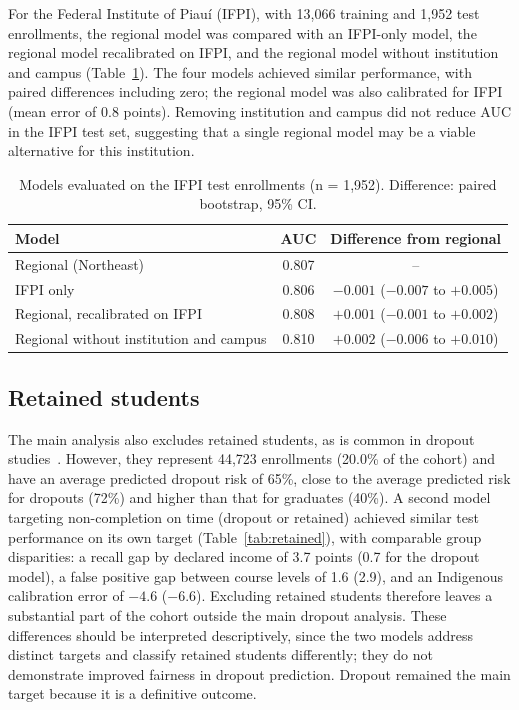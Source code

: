 \documentclass[12pt]{article}
\begin{document}
For the Federal Institute of Piauí (IFPI), with 13,066 training and 1,952 test enrollments, the regional model
was compared with an IFPI-only model, the regional model recalibrated on IFPI, and the regional model without
institution and campus (Table~\ref{tab:ifpi}). The four models achieved similar performance, with paired differences including
zero; the regional model was also calibrated for IFPI (mean error of 0.8 points). Removing institution and campus
did not reduce AUC in the IFPI test set, suggesting that a single regional model may be a viable alternative for
this institution.

\begin{table}[ht]
\centering
\caption{Models evaluated on the IFPI test enrollments (n = 1,952). Difference: paired bootstrap, 95\% CI.}
\label{tab:ifpi}
\small
\begin{tabular}{lcc}
\toprule
Model & AUC & Difference from regional \\
\midrule
Regional (Northeast) & 0.807 & -- \\
IFPI only & 0.806 & $-0.001$ ($-0.007$ to $+0.005$) \\
Regional, recalibrated on IFPI & 0.808 & $+0.001$ ($-0.001$ to $+0.002$) \\
Regional without institution and campus & 0.810 & $+0.002$ ($-0.006$ to $+0.010$) \\
\bottomrule
\end{tabular}
\end{table}

\subsection{Retained students}
\label{sec:retained}

The main analysis also excludes retained students, as is common in dropout studies~\cite{oliveira2022}. However,
they represent 44,723 enrollments (20.0\% of the cohort) and have an average predicted dropout risk of 65\%, close to the average predicted
risk for dropouts (72\%) and higher than that for graduates (40\%). A second model targeting non-completion on time (dropout or retained)
achieved similar test performance on its own target (Table~\ref{tab:retained}), with comparable group disparities: a recall gap by declared income of 3.7 points (0.7 for the dropout model), a false positive gap between course levels of 1.6 (2.9), and an Indigenous calibration error of $-4.6$ ($-6.6$). Excluding retained students therefore leaves a substantial part of the
cohort outside the main dropout analysis. These differences should be interpreted descriptively, since the two models address distinct targets and classify
retained students differently; they do not demonstrate improved fairness in dropout prediction. Dropout remained the main target because it is a definitive
outcome.
\end{document}
